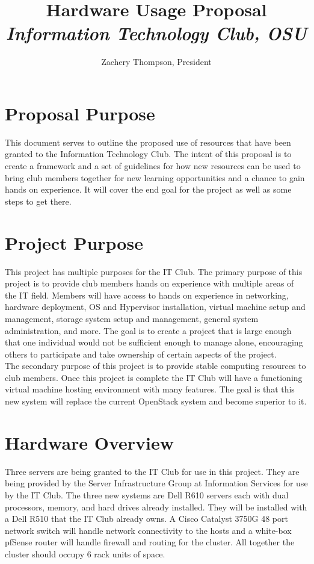 \documentclass[12pt]{article}
\title{
\textbf{Hardware Usage Proposal}
\\
\textit{Information Technology Club, OSU}
}
\author{Zachery Thompson, President}
\begin{document}


\maketitle{}
\clearpage{}

\tableofcontents{}
\clearpage{}


\section{Proposal Purpose}
This document serves to outline the proposed use of resources that have been granted to the Information Technology Club.
The intent of this proposal is to create a framework and a set of guidelines for how new resources can be used to bring
club members together for new learning opportunities and a chance to gain hands on experience. It will cover the end
goal for the project as well as some steps to get there. 

\section {Project Purpose}
This project has multiple purposes for the IT Club. The primary purpose of this project is to provide club members
hands on experience with multiple areas of the IT field. Members will have access to hands on experience in networking,
hardware deployment, OS and Hypervisor installation, virtual machine setup and management, storage system setup and management,
general system administration, and more. The goal is to create a project that is large enough that one individual would not
be sufficient enough to manage alone, encouraging others to participate and take ownership of certain aspects of the project.
\\
The secondary purpose of this project is to provide stable computing resources to club members. Once this project is complete 
the IT Club will have a functioning virtual machine hosting environment with many features. The goal is that this new system
will replace the current OpenStack system and become superior to it.

\section {Hardware Overview}
Three servers are being granted to the IT Club for use in this project. They are being provided by the Server Infrastructure Group
at Information Services for use by the IT Club. The three new systems are Dell R610 servers each with dual processors, memory, and
hard drives already installed. They will be installed with a Dell R510 that the IT Club already owns. A Cisco Catalyst 3750G 48
port network switch will handle network connectivity to the hosts and a white-box pfSense router will handle firewall and routing
for the cluster. All together the cluster should occupy 6 rack units of space. 
\end{document}
